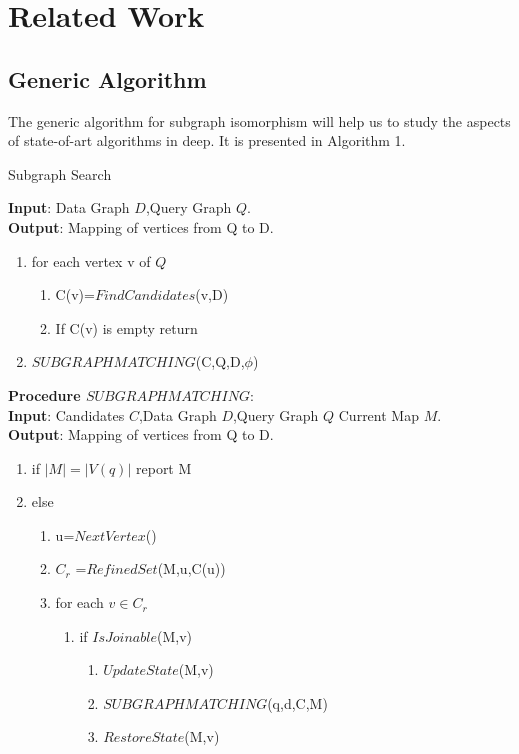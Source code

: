 \section{Related Work}
\label{sec:rw}
\subsection{Generic Algorithm}
\label{sec:ga}
	\hspace{10mm}The generic algorithm\cite{GEN} for subgraph isomorphism will help us to study the aspects of state-of-art algorithms in deep. It is presented in Algorithm 1.\\
\begin{algorithm}[H]
\caption{Subgraph Search}
\label{Graph Isomorphism}
\textbf{Input}: Data Graph $D$,Query Graph $Q$.\\
\textbf{Output}: Mapping of vertices from Q to D.\\
\begin{algorithmic}
 \item \begin{enumerate}
\item for each vertex v of $Q$ 
 \begin{enumerate}
\item C(v)=$FindCandidates$(v,D)
\item If C(v) is empty return 
\end{enumerate}
\item $SUBGRAPHMATCHING$(C,Q,D,$\phi$)
\end{enumerate}
\end{algorithmic}
\textbf{Procedure $SUBGRAPHMATCHING$}:\\
\textbf{Input}: Candidates $C$,Data Graph $D$,Query Graph $Q$ Current Map $M$.\\
\textbf{Output}: Mapping of vertices from Q to D.\\
\begin{algorithmic}
\item \begin{enumerate}
\item if $|M| = |V(q)| $ report M 
\item else
 \begin{enumerate}
\item u=$NextVertex$()
\item $ C_r $ =$RefinedSet$(M,u,C(u))  
\item for each $v \in C_r$ 
 \begin{enumerate}
\item if $IsJoinable$(M,v)
 \begin{enumerate}
\item $UpdateState$(M,v)
\item $SUBGRAPHMATCHING$(q,d,C,M)
\item $RestoreState$(M,v)
\end{enumerate}
\end{enumerate}
\end{enumerate}
\end{enumerate}
\end{algorithmic}
\end{algorithm}
